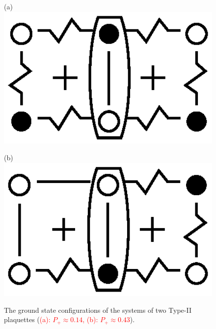 \documentclass[preprint,12pt]{elsarticle}
\begin{document}
	\begin{figure}[H]
		\centering
		\begin{minipage}{0.2\textwidth}
			\centering
			(a)
			\includegraphics[width=1\textwidth]{pictures/Type2_3x2.eps}
			\label{fig:Type2_3x2}
		\end{minipage}
		\hspace{20pt}
		\begin{minipage}{0.2\textwidth}
			\centering
			(b)
			\includegraphics[width=1\textwidth]{pictures/Type2_3x2_2.eps}
			\label{fig:Type2_3x2_2}
		\end{minipage}
		\caption{The ground state configurations of the systems of two Type-II plaquettes (\textcolor{red}{(a): $P_+\approx0.14$, (b): $P_+\approx0.43$}).}
		\label{fig:Type2_32}
	\end{figure}
	
\end{document}
